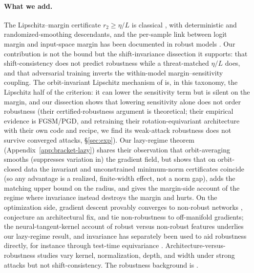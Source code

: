\documentclass{article}
\theoremstyle{definition}
\begin{document}
\paragraph{What we add.} The Lipschitz--margin certificate $r_2\ge\eta/L$ is classical \citep{hein2017formal,tsuzuku2018lipschitz}, with deterministic \citep{leino2021globally} and randomized-smoothing \citep{cohen2019certified} descendants, and the per-sample link between logit margin and input-space margin has been documented in robust models \citep{ngnawe2024detecting}. Our contribution is not the bound but the shift-invariance dissection it supports: that shift-consistency does not predict robustness while a threat-matched $\eta/L$ does, and that adversarial training inverts the within-model margin--sensitivity coupling. The orbit-invariant Lipschitz mechanism of \citet{wang2025bridging} is, in this taxonomy, the Lipschitz half of the criterion: it can lower the sensitivity term but is silent on the margin, and our dissection shows that lowering sensitivity alone does not order robustness (their certified-robustness argument is theoretical; their empirical evidence is FGSM/PGD, and retraining their rotation-equivariant architecture with their own code and recipe, we find its weak-attack robustness does not survive converged attacks, \S\ref{sec:exp}). Our lazy-regime theorem (Appendix~\ref{app:bracket-lazy}) shares their observation that orbit-averaging smooths (suppresses variation in) the gradient field, but shows that on orbit-closed data the invariant and unconstrained minimum-norm certificates coincide (so any advantage is a realized, finite-width effect, not a norm gap), adds the matching upper bound on the radius, and gives the margin-side account of the regime where invariance instead destroys the margin and hurts. On the optimization side, gradient descent provably converges to non-robust networks \citep{vardi2022gradient,frei2023double,li2025feature}, \citet{min2024can} conjecture an architectural fix, and \citet{melamed2023adversarial} tie non-robustness to off-manifold gradients; the neural-tangent-kernel account of robust versus non-robust features \citep{tsilivis2022what} underlies our lazy-regime result, and invariance has separately been used to aid robustness directly, for instance through test-time equivariance \citep{mao2023robust}. Architecture-versus-robustness studies \citep{huang2023revisiting} vary kernel, normalization, depth, and width under strong attacks but not shift-consistency. The robustness background is \citet{madry2018towards,goodfellow2015explaining,tsipras2019robustness}.
\end{document}
